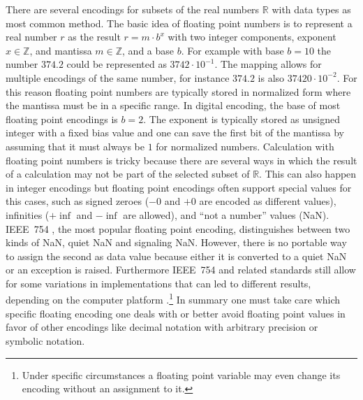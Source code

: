 There are several encodings for subsets of the real numbers $\mathbb{R}$ with
 data types as most common method.  The basic idea of
floating point numbers is to represent a real number $r$ as the result $r = m
\cdot b^x$ with two integer components, exponent $x \in \mathbb{Z}$, and
mantissa $m \in \mathbb{Z}$, and a base $b$. For example with base $b=10$ the
number $374.2$ could be represented as $3742 \cdot 10^{-1}$. The mapping allows
for multiple encodings of the same number, for instance $374.2$ is also $37420
\cdot 10^{-2}$. For this reason floating point numbers are typically stored in
normalized form where the mantissa must be in a specific range. In digital encoding, 
the base of most floating point encodings is $b=2$. The exponent is typically 
stored as unsigned integer with a fixed bias value and one can save the first bit 
of the mantissa by assuming that it must always be $1$ for normalized numbers.
Calculation with floating point numbers is tricky because there are several ways
in which the result of a calculation may not be part of the selected subset of 
$\mathbb{R}$. This can also happen in integer encodings but floating point 
encodings often support special values for this cases, such as signed zeroes 
($-0$ and $+0$ are encoded as different values), infinities ($+\inf$ and $-\inf$ 
are allowed), and ``not a number'' values (NaN). IEEE~754 \cite{ieee2008}, the
most popular floating point encoding, distinguishes between two kinds of NaN, 
quiet NaN and signaling NaN. However, there is no portable way to assign the second
as data value because either it is converted to a quiet NaN or an exception is 
raised. Furthermore IEEE~754 and related standards still allow for some variations 
in implementations that can led to different results, depending on the computer
platform \cite{Monniaux2008}.\footnote{Under specific circumstances a floating
point variable may even change its encoding without an assignment to it.}
In summary one must take care which specific floating encoding one deals with or
better avoid floating point values in favor of other encodings like
decimal notation with arbitrary precision or symbolic notation.

